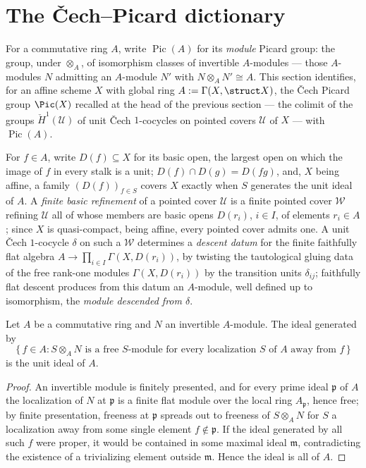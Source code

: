 \section{The \v Cech--Picard dictionary}

For a commutative ring \(A\), write \(\operatorname{Pic}(A)\) for its \emph{module} Picard
group: the group, under \(\otimes_A\), of isomorphism classes of invertible \(A\)-modules
--- those \(A\)-modules \(N\) admitting an \(A\)-module \(N'\) with \(N \otimes_A N' \cong A\).
This section identifies, for an affine scheme \(X\) with global ring \(A := \Gamma(X,\struct
X)\), the \v Cech Picard group \(\Pic(X)\) recalled at the head of the previous section ---
the colimit of the groups \(\check H^1(\mathcal U)\) of unit \v Cech \(1\)-cocycles on pointed
covers \(\mathcal U\) of \(X\) --- with \(\operatorname{Pic}(A)\).

For \(f \in A\), write \(D(f) \subseteq X\) for its basic open, the largest open on which the
image of \(f\) in every stalk is a unit; \(D(f) \cap D(g) = D(fg)\), and, \(X\) being affine, a
family \((D(f))_{f \in S}\) covers \(X\) exactly when \(S\) generates the unit ideal of \(A\).
A \emph{finite basic refinement} of a pointed cover \(\mathcal U\) is a finite pointed cover
\(\mathcal W\) refining \(\mathcal U\) all of whose members are basic opens \(D(r_i)\),
\(i \in I\), of elements \(r_i \in A\); since \(X\) is quasi-compact, being affine, every
pointed cover admits one. A unit \v Cech \(1\)-cocycle \(\delta\) on such a \(\mathcal W\)
determines a \emph{descent datum} for the finite faithfully flat algebra
\(A \to \prod_{i \in I} \Gamma(X, D(r_i))\), by twisting the tautological gluing data of the
free rank-one modules \(\Gamma(X,D(r_i))\) by the transition units \(\delta_{ij}\); faithfully
flat descent produces from this datum an \(A\)-module, well defined up to isomorphism, the
\emph{module descended from \(\delta\)}.

\begin{theorem}
  \label{thm:invertible_span_free}
  \leanok
  Let \(A\) be a commutative ring and \(N\) an invertible \(A\)-module. The ideal generated by
  \[
    \{\, f \in A : S \otimes_A N \text{ is a free } S\text{-module for every localization } S
    \text{ of } A \text{ away from } f \,\}
  \]
  is the unit ideal of \(A\).
\end{theorem}
\begin{proof}
  \leanok
  An invertible module is finitely presented, and for every prime ideal \(\mathfrak p\) of
  \(A\) the localization of \(N\) at \(\mathfrak p\) is a finite flat module over the local
  ring \(A_{\mathfrak p}\), hence free; by finite presentation, freeness at \(\mathfrak p\)
  spreads out to freeness of \(S \otimes_A N\) for \(S\) a localization away from some single
  element \(f \notin \mathfrak p\). If the ideal generated by all such \(f\) were proper, it
  would be contained in some maximal ideal \(\mathfrak m\), contradicting the existence of a
  trivializing element outside \(\mathfrak m\). Hence the ideal is all of \(A\).
\end{proof}

